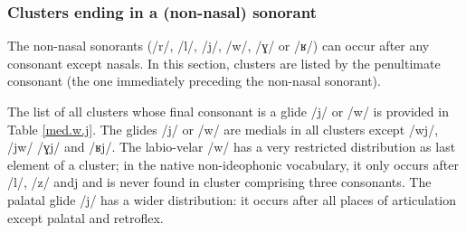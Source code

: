 \documentclass[oldfontcommands,oneside,a4paper,11pt]{article}
\newcommand{\ipa}[1]{{\phon/#1/}} %
\begin{document}

 \subsubsection{Clusters ending in a (non-nasal) sonorant}   \label{sec:medial}
  The non-nasal sonorants (\ipa{r}, \ipa{l}, \ipa{j}, \ipa{w}, \ipa{ɣ} or \ipa{ʁ}) can occur after any consonant except nasals. In this section, clusters are listed by the penultimate consonant  (the one immediately preceding the non-nasal sonorant).  
  
  
  
  The list of all clusters whose final consonant is a glide  \ipa{j} or \ipa{w} is provided in Table \ref{med.w.j}. The glides  \ipa{j} or \ipa{w} are medials in all clusters except \ipa{wj}, \ipa{jw} \ipa{ɣj} and \ipa{ʁj}. The labio-velar \ipa{w} has a very restricted distribution as last element of a cluster; in the native non-ideophonic vocabulary, it only occurs after \ipa{l}, \ipa{z} and{j} and is never found in cluster comprising three consonants. The palatal glide \ipa{j} has a wider distribution: it occurs after all places of articulation except palatal and retroflex.
  
  
  
\end{document}
